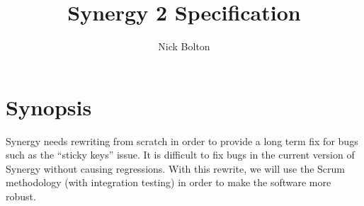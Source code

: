 \documentclass{article}
\title{Synergy 2 Specification}
\author{Nick Bolton}
\begin{document}
\maketitle
\clearpage

\section*{Synopsis}

Synergy needs rewriting from scratch in order to provide a long term fix for 
bugs such as the ``sticky keys'' issue. It is difficult to fix bugs in the
current version of Synergy without causing regressions. With this rewrite, we
will use the Scrum methodology (with integration testing) in order to make the
software more robust.

\clearpage

\setcounter{tocdepth}{2}
\tableofcontents
\clearpage


\clearpage


\clearpage


\clearpage


\clearpage

\appendix

\end{document}
